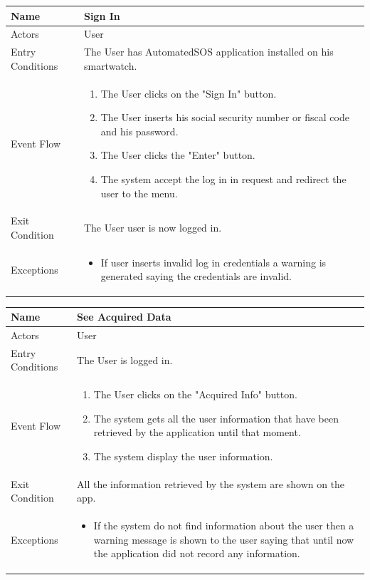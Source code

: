 \begin{enumerate}
\FloatBarrier
\begin{table}[h]
\begin{tabular}{|l|p{}|}
\hline
Name             & Sign In \\ \hline
Actors           & User  \\ \hline
Entry Conditions & The User has AutomatedSOS application installed on his smartwatch.    \\ \hline
Event Flow       & \begin{enumerate}
            \item The User clicks on the "Sign In" button.
            \item The User inserts his social security number or fiscal code and his password.
            \item The User clicks the "Enter" button.
            \item The system accept the log in in request and redirect the user to the menu.
        \end{enumerate}\\ \hline
Exit Condition   & The User user is now logged in.\\ \hline
Exceptions       & \begin{itemize}
\item If user inserts invalid log in credentials a warning is generated saying the credentials are invalid.
\end{itemize}\\ \hline
\end{tabular}
\end{table}
\FloatBarrier

\FloatBarrier
\begin{table}[h]
\begin{tabular}{|l|p{}|}
\hline
Name             & See Acquired Data \\ \hline
Actors           & User  \\ \hline
Entry Conditions & The User is logged in. \\ \hline
Event Flow       & \begin{enumerate}
            \item The User clicks on the "Acquired Info" button.
            \item The system gets all the user information that have been retrieved by the application until that moment.
            \item The system display the user information.
\end{enumerate}\\ \hline
Exit Condition   & All the information retrieved by the system are shown on the app.\\ \hline
Exceptions       & \begin{itemize}
\item If the system do not find information about the user then a warning message is shown to the user saying that until now the application did not record any information.
\end{itemize}  \\ \hline
\end{tabular}
\end{table}
\FloatBarrier


\end{enumerate}
